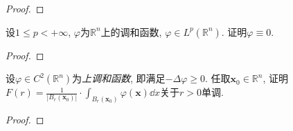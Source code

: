 \begin{quiza}
\begin{proof}
\end{proof}
\woe 设\(1\leqslant p<+\infty\), \(\varphi\)为\(\mathbb{R}^n\)上的调和函数, \(\varphi\in L^p(\mathbb{R}^n)\). 证明\(\varphi\equiv 0\).
\begin{proof}

\end{proof}
\woe 设\(\varphi\in C^2(\mathbb{R}^n)\)为\textit{上调和函数}, 即满足\(-\Delta\varphi\geqslant 0\). 任取\(\boldsymbol{x}_0\in\mathbb{R}^n\), 证明\(F(r)=\frac{1}{|B_r(\boldsymbol{x}_0)|}\cdot\int_{B_r(\boldsymbol{x}_0)}\varphi(\boldsymbol{x})\dd x\)关于\(r>0\)单调.
\begin{proof}


\end{proof}
\end{quiza}
